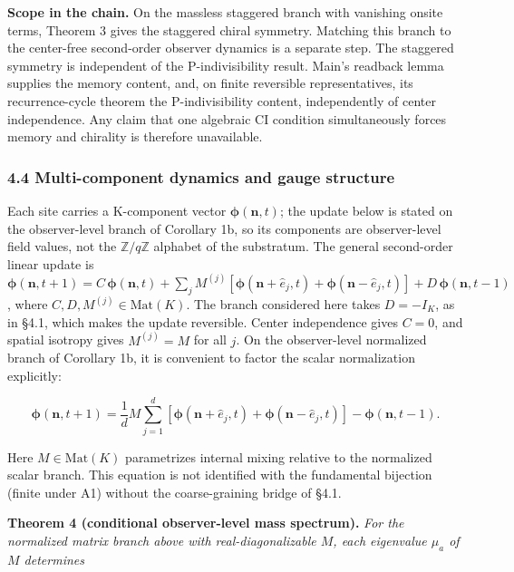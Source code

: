 \documentclass[
]{article}
\begin{document}
\textbf{Scope in the chain.} On the massless staggered branch with
vanishing onsite terms, Theorem 3 gives the staggered chiral symmetry.
Matching this branch to the center-free second-order observer dynamics
is a separate step. The staggered symmetry is independent of the
P-indivisibility result. Main's readback lemma supplies the memory
content, and, on finite reversible representatives, its recurrence-cycle
theorem the P-indivisibility content, independently of center
independence. Any claim that one algebraic CI condition simultaneously
forces memory and chirality is therefore unavailable.

\hypertarget{multi-component-dynamics-and-gauge-structure}{%
\subsubsection{4.4 Multi-component dynamics and gauge
structure}\label{multi-component-dynamics-and-gauge-structure}}

Each site carries a K-component vector
\(\boldsymbol{\phi}(\mathbf{n}, t)\); the update below is stated on the
observer-level branch of Corollary 1b, so its components are
observer-level field values, not the \(\mathbb{Z}/q\mathbb{Z}\) alphabet
of the substratum. The general second-order linear update is
\(\boldsymbol{\phi}(\mathbf{n}, t+1) = C\,\boldsymbol{\phi}(\mathbf{n}, t) + \sum_j M^{(j)}[\boldsymbol{\phi}(\mathbf{n}+\hat{e}_j, t) + \boldsymbol{\phi}(\mathbf{n}-\hat{e}_j, t)] + D\,\boldsymbol{\phi}(\mathbf{n}, t-1)\),
where \(C, D, M^{(j)} \in \mathrm{Mat}(K)\). The branch considered here
takes \(D=-I_K\), as in §4.1, which makes the update reversible. Center
independence gives \(C=0\), and spatial isotropy gives \(M^{(j)}=M\) for
all \(j\). On the observer-level normalized branch of Corollary 1b, it
is convenient to factor the scalar normalization explicitly:

\[\boldsymbol{\phi}(\mathbf{n}, t+1) = \frac1d M \sum_{j=1}^{d} \left[\boldsymbol{\phi}(\mathbf{n} + \hat{e}_j, t) + \boldsymbol{\phi}(\mathbf{n} - \hat{e}_j, t)\right] - \boldsymbol{\phi}(\mathbf{n}, t-1).\]

Here \(M\in\mathrm{Mat}(K)\) parametrizes internal mixing relative to
the normalized scalar branch. This equation is not identified with the
fundamental bijection (finite under A1) without the coarse-graining
bridge of §4.1.

\textbf{Theorem 4 (conditional observer-level mass spectrum).} \emph{For
the normalized matrix branch above with real-diagonalizable \(M\), each
eigenvalue \(\mu_a\) of \(M\) determines}
\end{document}
